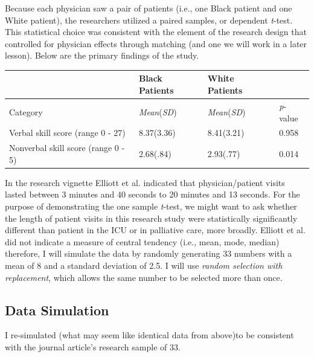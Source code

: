 \documentclass[
  11pt,
]{book}
\begin{document}
Because each physician saw a pair of patients (i.e., one Black patient and one White patient), the researchers utilized a paired samples, or dependent \emph{t}-test. This statistical choice was consistent with the element of the research design that controlled for physician effects through matching (and one we will work in a later lesson). Below are the primary findings of the study.

\begin{longtable}[]{@{}llll@{}}
\toprule\noalign{}
& Black Patients & White Patients & \\
\midrule\noalign{}
\endhead
\bottomrule\noalign{}
\endlastfoot
Category & \emph{Mean}(\emph{SD}) & \emph{Mean}(\emph{SD}) & \emph{p}-value \\
Verbal skill score (range 0 - 27) & 8.37(3.36) & 8.41(3.21) & 0.958 \\
Nonverbal skill score (range 0 - 5) & 2.68(.84) & 2.93(.77) & 0.014 \\
\end{longtable}

In the research vignette Elliott et al. \citeyearpar{elliott_differences_2016} indicated that physician/patient visits lasted between 3 minutes and 40 seconds to 20 minutes and 13 seconds. For the purpose of demonstrating the one sample \emph{t}-test, we might want to ask whether the length of patient visits in this research study were statistically significantly different than patient in the ICU or in palliative care, more broadly. Elliott et al.\citeyearpar{elliott_differences_2016} did not indicate a measure of central tendency (i.e., mean, mode, median) therefore, I will simulate the data by randomly generating 33 numbers with a mean of 8 and a standard deviation of 2.5. I will use \emph{random selection with replacement}, which allows the same number to be selected more than once.

\hypertarget{data-simulation}{%
\subsection{Data Simulation}\label{data-simulation}}

I re-simulated (what may seem like identical data from above)to be consistent with the journal article's research sample of 33.
\end{document}
